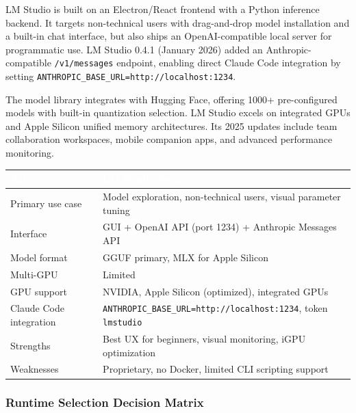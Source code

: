 \documentclass[11pt,letterpaper]{article}
\newcommand{\tableheader}[1]{\textbf{\sffamily\textcolor{white}{#1}}}
\begin{document}
LM Studio is built on an Electron/React frontend with a Python inference backend. It targets non-technical users with drag-and-drop model installation and a built-in chat interface, but also ships an OpenAI-compatible local server for programmatic use. LM Studio 0.4.1 (January 2026) added an Anthropic-compatible \texttt{/v1/messages} endpoint, enabling direct Claude Code integration by setting \texttt{ANTHROPIC\_BASE\_URL=http://localhost:1234}.

The model library integrates with Hugging Face, offering 1000+ pre-configured models with built-in quantization selection. LM Studio excels on integrated GPUs and Apple Silicon unified memory architectures. Its 2025 updates include team collaboration workspaces, mobile companion apps, and advanced performance monitoring.

\begin{center}
\begin{tabularx}{\textwidth}{L{2.8cm}X}
\toprule
{}
\tableheader{Attribute} & \tableheader{LM Studio Detail} \\
\midrule
Primary use case & Model exploration, non-technical users, visual parameter tuning \\
Interface & GUI + OpenAI API (port 1234) + Anthropic Messages API \\
Model format & GGUF primary, MLX for Apple Silicon \\
Multi-GPU & Limited \\
GPU support & NVIDIA, Apple Silicon (optimized), integrated GPUs \\
Claude Code integration & \texttt{ANTHROPIC\_BASE\_URL=http://localhost:1234}, token \texttt{lmstudio} \\
Strengths & Best UX for beginners, visual monitoring, iGPU optimization \\
Weaknesses & Proprietary, no Docker, limited CLI scripting support \\
\bottomrule
\end{tabularx}
\end{center}

\subsubsection{Runtime Selection Decision Matrix}
\end{document}
